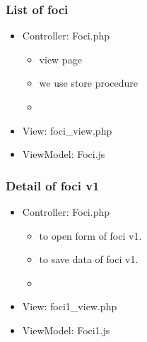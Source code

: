 \documentclass[letterpaper,10pt,english,openany,oneside]{sphinxmanual}
\begin{document}
\subsubsection{List of foci}
\label{\detokenize{module/module:list-of-foci}}\begin{itemize}
\item {} 
\sphinxAtStartPar
Controller: Foci.php
\begin{itemize}
\item {} 
\sphinxAtStartPar
{} view page

\item {} 
\sphinxAtStartPar
{} we use store procedure 

\item {} 
\sphinxAtStartPar
{}

\end{itemize}

\item {} 
\sphinxAtStartPar
View: foci\_view.php

\item {} 
\sphinxAtStartPar
ViewModel: Foci.js

\end{itemize}


\subsubsection{Detail of foci v1}
\label{\detokenize{module/module:detail-of-foci-v1}}\begin{itemize}
\item {} 
\sphinxAtStartPar
Controller: Foci.php
\begin{itemize}
\item {} 
\sphinxAtStartPar
{} to open form of foci v1.

\item {} 
\sphinxAtStartPar
{} to save data of foci v1.

\end{itemize}

\begin{sphinxVerbatim}[commandchars=\\\{\}]
     
   
 
\end{sphinxVerbatim}
\begin{itemize}
\item {} 
\sphinxAtStartPar
{}

\end{itemize}

\item {} 
\sphinxAtStartPar
View: foci1\_view.php

\item {} 
\sphinxAtStartPar
ViewModel: Foci1.js

\end{itemize}
\end{document}

